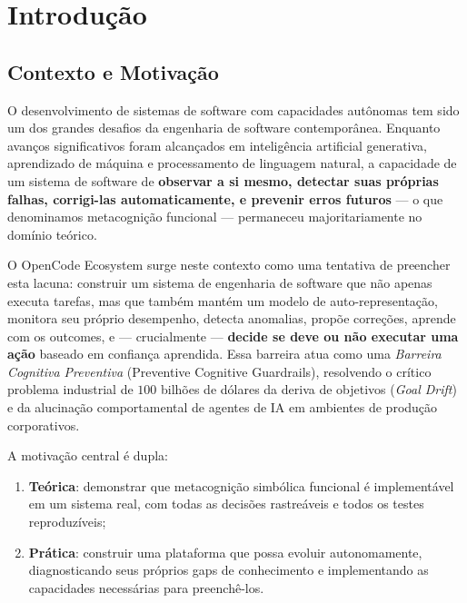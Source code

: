 \documentclass[12pt,a4paper,oneside]{abntex2}
\begin{document}
\listoffigures*
\cleardoublepage

\listoftables*
\cleardoublepage

\tableofcontents*
\cleardoublepage

\chapter{Introdução}
\label{ch:introducao}

\section{Contexto e Motivação}

O desenvolvimento de sistemas de software com capacidades autônomas tem sido um dos grandes desafios da engenharia de software contemporânea. Enquanto avanços significativos foram alcançados em inteligência artificial generativa, aprendizado de máquina e processamento de linguagem natural, a capacidade de um sistema de software de \textbf{observar a si mesmo, detectar suas próprias falhas, corrigi-las automaticamente, e prevenir erros futuros} — o que denominamos metacognição funcional — permaneceu majoritariamente no domínio teórico.

O OpenCode Ecosystem surge neste contexto como uma tentativa de preencher esta lacuna: construir um sistema de engenharia de software que não apenas executa tarefas, mas que também mantém um modelo de auto-representação, monitora seu próprio desempenho, detecta anomalias, propõe correções, aprende com os outcomes, e — crucialmente — \textbf{decide se deve ou não executar uma ação} baseado em confiança aprendida. Essa barreira atua como uma \textit{Barreira Cognitiva Preventiva} (Preventive Cognitive Guardrails), resolvendo o crítico problema industrial de $100$ bilhões de dólares da deriva de objetivos (\textit{Goal Drift}) e da alucinação comportamental de agentes de IA em ambientes de produção corporativos.

A motivação central é dupla:

\begin{enumerate}[label=(\alph*)]
    \item \textbf{Teórica}: demonstrar que metacognição simbólica funcional é implementável em um sistema real, com todas as decisões rastreáveis e todos os testes reproduzíveis;
    \item \textbf{Prática}: construir uma plataforma que possa evoluir autonomamente, diagnosticando seus próprios gaps de conhecimento e implementando as capacidades necessárias para preenchê-los.
\end{enumerate}
\end{document}
